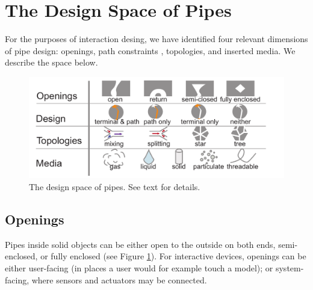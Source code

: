 
\section{The Design Space of Pipes}
For the purposes of interaction desing, we have identified four relevant dimensions of pipe design: openings, path constraints , topologies, and inserted media.  We describe the space below.

\begin{figure}[t]
\centering
    \includegraphics[width=1.0\columnwidth]{figures/tubespace.pdf}
\caption{The design space of pipes.  See text for details.  }
\label{fig:pipespace}
\end{figure}

\subsection{Openings}
Pipes inside solid objects can be either open to the outside on both ends, semi-enclosed, or fully enclosed (see Figure \ref{fig:pipespace}). For interactive devices, openings can be either user-facing (in places a user would for example touch a model); or system-facing, where sensors and actuators may be connected.

